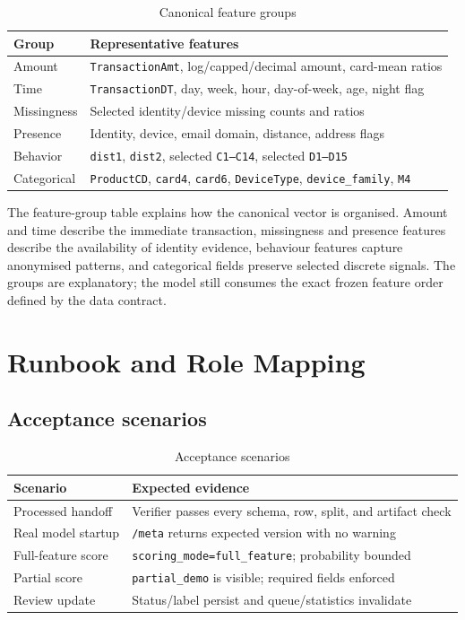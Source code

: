 \begin{table}[H]
\centering
\small
{}
\caption{Canonical feature groups}
\label{tab:feature-groups}
\begin{tabularx}{\textwidth}{p{}X}
\toprule
\textbf{Group} & \textbf{Representative features}\\
\midrule
Amount & \texttt{TransactionAmt}, log/capped/decimal amount, card-mean ratios\\
Time & \texttt{TransactionDT}, day, week, hour, day-of-week, age, night flag\\
Missingness & Selected identity/device missing counts and ratios\\
Presence & Identity, device, email domain, distance, address flags\\
Behavior & \texttt{dist1}, \texttt{dist2}, selected \texttt{C1--C14}, selected \texttt{D1--D15}\\
Categorical & \texttt{ProductCD}, \texttt{card4}, \texttt{card6}, \texttt{DeviceType}, \texttt{device\_family}, \texttt{M4}\\
\bottomrule
\end{tabularx}
\end{table}

The feature-group table explains how the canonical vector is organised. Amount
and time describe the immediate transaction, missingness and presence features
describe the availability of identity evidence, behaviour features capture
anonymised patterns, and categorical fields preserve selected discrete signals.
The groups are explanatory; the model still consumes the exact frozen feature
order defined by the data contract.

\chapter{Runbook and Role Mapping}
\label{app:runbook}

\section{Acceptance scenarios}

\begin{table}[H]
\centering
\small
{}
\caption{Acceptance scenarios}
\label{tab:acceptance}
\begin{tabularx}{\textwidth}{p{}X}
\toprule
\textbf{Scenario} & \textbf{Expected evidence}\\
\midrule
Processed handoff & Verifier passes every schema, row, split, and artifact check\\
Real model startup & \texttt{/meta} returns expected version with no warning\\
Full-feature score & \texttt{scoring\_mode=full\_feature}; probability bounded\\
Partial score & \texttt{partial\_demo} is visible; required fields enforced\\
Review update & Status/label persist and queue/statistics invalidate\\
\bottomrule
\end{tabularx}
\end{table}

